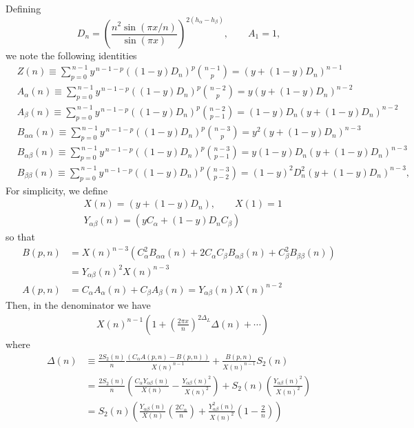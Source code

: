 \documentclass[11pt]{article}
\newcommand{\nn}{\nonumber}
\newcommand{\lb}{\left(}
\newcommand{\rb}{\right)}
\begin{document}
  Defining
  \begin{equation}
    D_{n}=\left(\frac{n^{2}\sin(\pi x/n)}{\sin(\pi x)}\right)^{2(h_\alpha-h_\beta)}
    ,\qquad A_{1}=1,
  \end{equation}
  we note the following identities
  \begin{align}
     & Z(n)\equiv \sum_{p=0}^{\,n-1}y^{\,n-1-p}((1-y)D_{n})^{p}{n-1\choose p}= (y+(1-y) D_{n})^{n-1}                                 \\
     & A_{\alpha}(n)\equiv \sum_{p=0}^{\,n-1}y^{\,n-1-p}((1-y)D_{n})^{p}{n-2\choose p}=y(y+(1-y) D_{n})^{n-2}                        \\
     & A_{\beta}(n)\equiv \sum_{p=0}^{\,n-1}y^{\,n-1-p}((1-y)D_{n})^{p}{n-2\choose p-1}=(1-y)D_{n}(y+(1-y) D_{n})^{n-2}              \\
     & B_{\alpha\alpha}(n)\equiv\sum_{p=0}^{\,n-1}y^{\,n-1-p}((1-y)D_{n})^{p}{n-3\choose p}= y^{2}(y+(1-y)D_{n})^{n-3}               \\
     & B_{\alpha\beta}(n)\equiv\sum_{p=0}^{\,n-1}y^{\,n-1-p}((1-y)D_{n})^{p}{n-3\choose p-1}= y(1-y) D_{n}(y+(1-y)D_{n})^{n-3}       \\
     & B_{\beta\beta}(n)\equiv\sum_{p=0}^{\,n-1}y^{\,n-1-p}((1-y)D_{n})^{p}{n-3\choose p-2}= (1-y)^{2}D_{n}^{2}(y+(1-y)D_{n})^{n-3},
  \end{align}
  For simplicity, we define
  \begin{align}
     & X(n)=(y+(1-y)D_{n}), \qquad X(1)=1\nn                 \\
     & Y_{\alpha\beta}(n)=(y C_{\alpha}+(1-y)D_{n}C_{\beta})
  \end{align}
  so that
  \begin{align}
    B(p,n) & =X(n)^{n-3}\lb C_{\alpha}^{2}B_{\alpha\alpha}(n)+2C_{\alpha}C_{\beta}B_{\alpha\beta}(n)+C_{\beta}^{2}B_{\beta\beta}(n)\rb\nn \\
           & =Y_{\alpha\beta}(n)^{2}X(n)^{n-3}\nn                                                                                         \\
    A(p,n) & = C_{\alpha}A_{\alpha}(n)+C_{\beta}A_{\beta}(n)=Y_{\alpha\beta}(n)X(n)^{n-2}
  \end{align}
  Then, in the denominator we have
  \begin{align}
     & X(n)^{n-1}\lb 1+\lb\frac{2\pi x}{n}\rb^{2\Delta_L}\Delta(n)+\cdots \rb
  \end{align}
  where
  \begin{align}
    \Delta(n) & \equiv \frac{2S_{2}(n)}{n}\frac{(C_{\alpha}A(p,n)-B(p,n))}{X(n)^{n-1}}+\frac{B(p,n)}{X(n)^{n-1}}S_{2}(n)\nn                                                          \\
              & =\frac{2S_{2}(n)}{n}\lb \frac{C_{\alpha}Y_{\alpha\beta}(n)}{ X(n)}-\frac{Y_{\alpha\beta}(n)^{2}}{X(n)^{2}}\rb+S_{2}(n)\lb \frac{Y_{\alpha\beta}(n)^{2}}{X(n)^{2}}\rb \\
              & =S_{2}(n)\lb \frac{Y_{\alpha\beta}(n)}{X(n)}\left(\frac{2C_{\alpha}}{n}\right)+\frac{Y_{\alpha\beta}^{2}(n)}{X(n)^{2}}\lb 1-\frac{2}{n}\rb\rb                        %
  \end{align}
\end{document}
